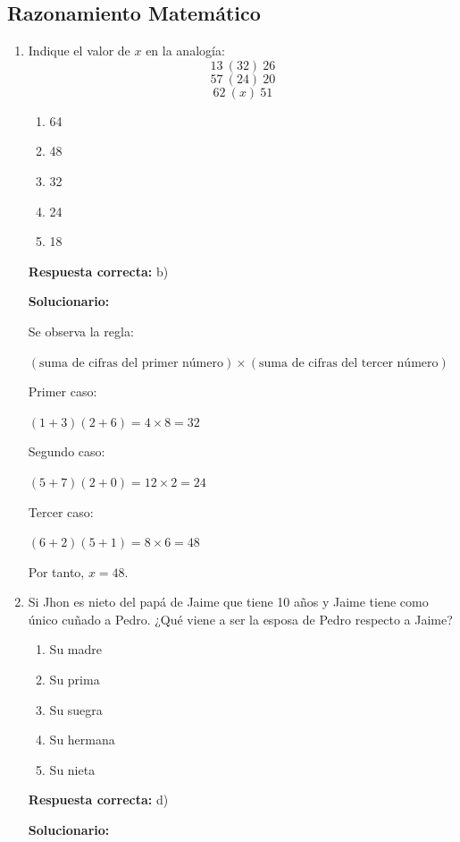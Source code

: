 \subsection*{Razonamiento Matemático}

\begin{enumerate}[resume]
	
	\item Indique el valor de \(x\) en la analogía:
	\[
	13\ (32)\ 26
	\]
	\[
	57\ (24)\ 20
	\]
	\[
	62\ (x)\ 51
	\]
	\begin{enumerate}[label=\alph*)]
		\item 64
		\item 48
		\item 32
		\item 24
		\item 18
	\end{enumerate}
	\textbf{Respuesta correcta:} b)
	
	\vspace{2mm}
	\textbf{Solucionario:}
	
	Se observa la regla:
	
	$(\text{suma de cifras del primer número}) \times (\text{suma de cifras del tercer número})$
	
	Primer caso:
	
	$(1+3)(2+6)=4\times 8=32$
	
	Segundo caso:
	
	$(5+7)(2+0)=12\times 2=24$
	
	Tercer caso:
	
	$(6+2)(5+1)=8\times 6=48$
	
	Por tanto, \(\boxed{x=48}\).
	
	\vspace{6mm}
	
	\item Si Jhon es nieto del papá de Jaime que tiene 10 años y Jaime tiene como único cuñado a Pedro. ¿Qué viene a ser la esposa de Pedro respecto a Jaime?
\begin{enumerate}[label=\alph*)]
	\item Su madre
	\item Su prima
	\item Su suegra
	\item Su hermana
	\item Su nieta
\end{enumerate}
\textbf{Respuesta correcta:} d)

	\vspace{2mm}
\textbf{Solucionario:}


\end{enumerate}
